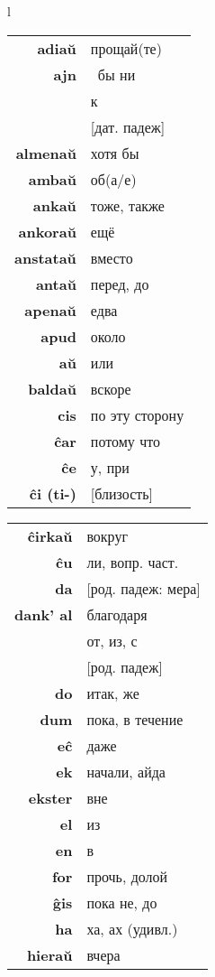 \documentclass{article}
\begin{document}
\begin{center}
\begin{tabular}{l}
\begin{tabular}{>{\bfseries}rl}
adiaŭ & прощай(те)\\
ajn & \textellipsis~бы ни \\
\multirow{2}{*}{al} & к \\
& {}[дат. падеж] \\
almenaŭ & хотя бы \\
ambaŭ & об(а/е) \\
ankaŭ & тоже, также \\
ankoraŭ & ещё \\
anstataŭ & вместо \\
antaŭ & перед, до \\
apenaŭ & едва \\
apud & около \\
aŭ & или \\
baldaŭ & вскоре \\
cis & по эту сторону \\
ĉar & потому что \\
ĉe & у, при \\
ĉi (ti-) & {}[близость] \\
\end{tabular}
\hspace{-2em}
\begin{tabular}{>{\bfseries}rl}
ĉirkaŭ & вокруг \\
ĉu & ли, вопр. част. \\
da & {}[род. падеж: мера] \\
dank' al & благодаря \\
\multirow{2}{*}{de} & от, из, с \\
& {}[род. падеж] \\
do & итак, же \\
dum & пока, в течение \\
eĉ & даже \\
ek & начали, айда \\
ekster & вне \\
el & из \\
en & в \\
for & прочь, долой \\
ĝis & пока не, до \\
ha & ха, ах (удивл.) \\
hieraŭ & вчера \\

\end{tabular}
\end{tabular}
\end{center}
\end{document}
